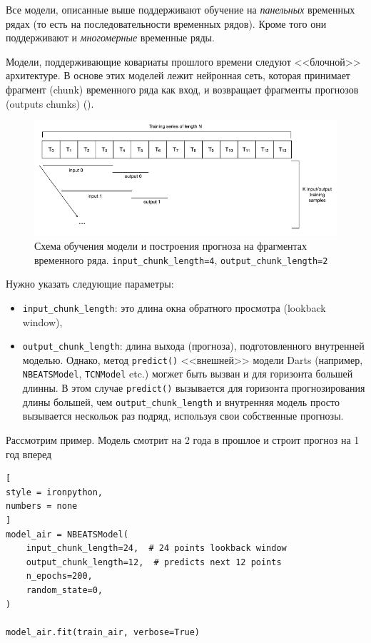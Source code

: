 \documentclass[%
	11pt,
	a4paper,
	utf8,
		]{article}
\begin{document}
Все модели, описанные выше поддерживают обучение на \emph{панельных} временных рядах (то есть на последовательности временных рядов). Кроме того они поддерживают и \emph{многомерные} временные ряды.

Модели, поддерживающие ковариаты прошлого времени следуют <<блочной>> архитектуре. В основе этих моделей лежит нейронная сеть, которая принимает фрагмент (chunk) временного ряда как вход, и возвращает фрагменты прогнозов (outputs chunks) (). 

\begin{figure}[h]
	\centering
	\includegraphics[scale=0.9 ]{figures/block_arch.png}
	\caption{ Схема обучения модели и построения прогноза на фрагментах временного ряда. \texttt{input\_chunk\_length=4}, \texttt{output\_chunk\_length=2} }\label{fig:block_arch}
\end{figure}

Нужно указать следующие параметры:
\begin{itemize}
	\item \verb|input_chunk_length|: это длина окна обратного просмотра (lookback window),
	
	\item \verb|output_chunk_length|: длина выхода (прогноза), подготовленного внутренней моделью. Однако, метод \verb|predict()| <<внешней>> модели Darts (например, \verb|NBEATSModel|, \verb|TCNModel| etc.) могжет быть вызван и для горизонта большей длинны. В этом случае \verb|predict()| вызывается для горизонта прогнозирования длины большей, чем \verb|output_chunk_length| и внутренняя модель просто вызывается нескольок раз подряд, используя свои собственные прогнозы.
\end{itemize}

Рассмотрим пример. Модель смотрит на 2 года в прошлое и строит прогноз на 1 год вперед
\begin{lstlisting}[
style = ironpython,
numbers = none
]
model_air = NBEATSModel(
    input_chunk_length=24,  # 24 points lookback window
    output_chunk_length=12,  # predicts next 12 points
    n_epochs=200,
    random_state=0,
)

model_air.fit(train_air, verbose=True)
\end{lstlisting}
\end{document}
